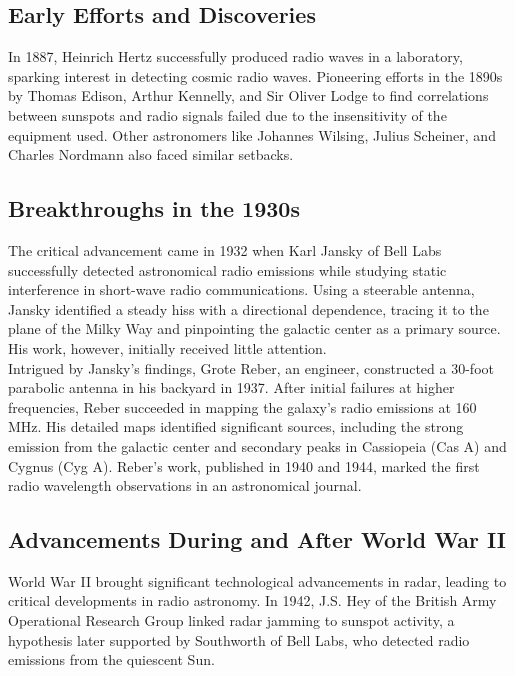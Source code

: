 \subsection{Early Efforts and Discoveries}

In 1887, Heinrich Hertz successfully produced radio waves in a laboratory, sparking interest in detecting cosmic radio waves. Pioneering efforts in the 1890s by Thomas Edison, Arthur Kennelly, and Sir Oliver Lodge to find correlations between sunspots and radio signals failed due to the insensitivity of the equipment used. Other astronomers like Johannes Wilsing, Julius Scheiner, and Charles Nordmann also faced similar setbacks.

\subsection{Breakthroughs in the 1930s}

The critical advancement came in 1932 when Karl Jansky of Bell Labs successfully detected astronomical radio emissions while studying static interference in short-wave radio communications. Using a steerable antenna, Jansky identified a steady hiss with a directional dependence, tracing it to the plane of the Milky Way and pinpointing the galactic center as a primary source. His work, however, initially received little attention. \\

Intrigued by Jansky's findings, Grote Reber, an engineer, constructed a 30-foot parabolic antenna in his backyard in 1937. After initial failures at higher frequencies, Reber succeeded in mapping the galaxy's radio emissions at 160 MHz. His detailed maps identified significant sources, including the strong emission from the galactic center and secondary peaks in Cassiopeia (Cas A) and Cygnus (Cyg A). Reber's work, published in 1940 and 1944, marked the first radio wavelength observations in an astronomical journal.

\subsection{Advancements During and After World War II}

World War II brought significant technological advancements in radar, leading to critical developments in radio astronomy. In 1942, J.S. Hey of the British Army Operational Research Group linked radar jamming to sunspot activity, a hypothesis later supported by Southworth of Bell Labs, who detected radio emissions from the quiescent Sun. \\

